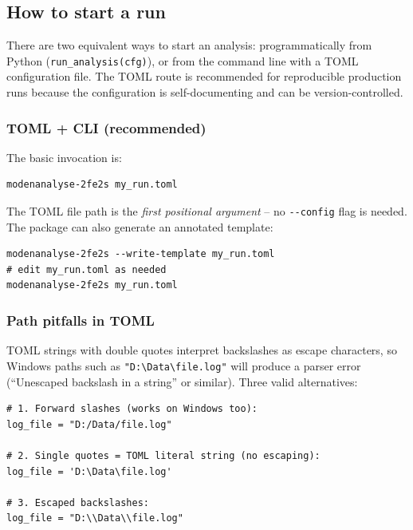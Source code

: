 \documentclass[11pt,a4paper,twoside]{article}
\theoremstyle{remark}
\begin{document}
\subsection{How to start a run}
\label{sec:workflow-how-to-start}

There are two equivalent ways to start an analysis: programmatically
from Python (\texttt{run\_analysis(cfg)}), or from the command line
with a TOML configuration file. The TOML route is recommended for
reproducible production runs because the configuration is
self-documenting and can be version-controlled.

\subsubsection*{TOML + CLI (recommended)}

The basic invocation is:

\begin{lstlisting}[style=bash]
modenanalyse-2fe2s my_run.toml
\end{lstlisting}

The TOML file path is the \emph{first positional argument} -- no
\texttt{-{}-config} flag is needed. The package can also generate
an annotated template:

\begin{lstlisting}[style=bash]
modenanalyse-2fe2s --write-template my_run.toml
# edit my_run.toml as needed
modenanalyse-2fe2s my_run.toml
\end{lstlisting}

\subsubsection*{Path pitfalls in TOML}

TOML strings with double quotes interpret backslashes as escape
characters, so Windows paths such as \texttt{"D:\textbackslash{}Data\textbackslash{}file.log"}
will produce a parser error (``Unescaped backslash in a string''
or similar). Three valid alternatives:

\begin{lstlisting}[style=bash]
# 1. Forward slashes (works on Windows too):
log_file = "D:/Data/file.log"

# 2. Single quotes = TOML literal string (no escaping):
log_file = 'D:\Data\file.log'

# 3. Escaped backslashes:
log_file = "D:\\Data\\file.log"
\end{lstlisting}
\end{document}

